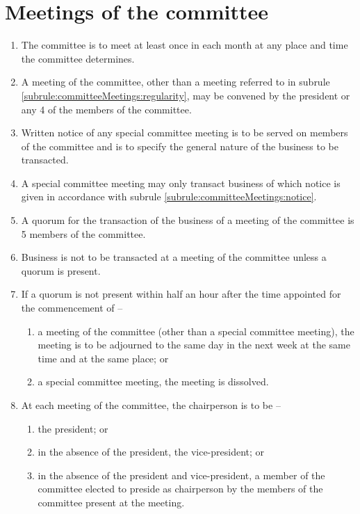 \section{Meetings of the committee}
\label{rule:committeeMeetings}

\begin{enumerate}
	\item \label{subrule:committeeMeetings:regularity} The committee is to meet at least once in each month at any place and time the committee determines.
	\item \label{subrule:committeeMeetings:special} A meeting of the committee, other than a meeting referred to in subrule \ref{subrule:committeeMeetings:regularity}, may be convened by the president or any 4 of the members of the committee.
	\item \label{subrule:committeeMeetings:notice} Written notice of any special committee meeting is to be served on members of the committee and is to specify the general nature of the business to be transacted.
	\item A special committee meeting may only transact business of which notice is given in accordance with subrule \ref{subrule:committeeMeetings:notice}.
	\item A quorum for the transaction of the business of a meeting of the committee is 5 members of the committee.
	\item Business is not to be transacted at a meeting of the committee unless a quorum is present.
	
	\item If a quorum is not present within half an hour after the time appointed for the commencement of --
	\begin{enumerate}
		\item a meeting of the committee (other than a special committee meeting), the meeting is to be adjourned to the same day in the next week at the same time and at the same place; or
		\item a special committee meeting, the meeting is dissolved.
	\end{enumerate}
	
	\item At each meeting of the committee, the chairperson is to be --
	\begin{enumerate}
		\item the president; or
		\item in the absence of the president, the vice-president; or
		\item in the absence of the president and vice-president, a member of the committee elected to preside as chairperson by the members of the committee present at the meeting.
	\end{enumerate}
	

\end{enumerate}
